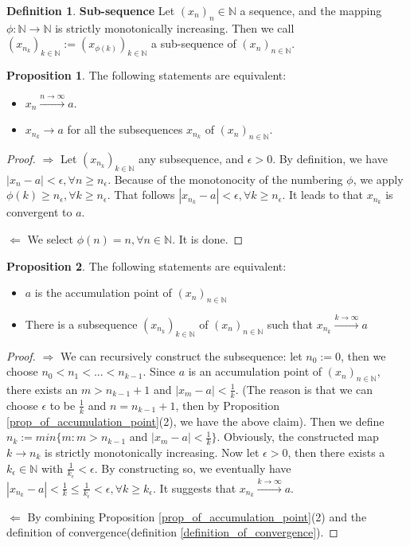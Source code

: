 \documentclass{article}
\theoremstyle{definition}
\newtheorem{defi}{Definition}[subsection]
\newtheorem{prop}{Proposition}[subsection]
\begin{document}
\begin{defi}
\textbf{Sub-sequence} Let $(x_n)_n\in \mathbb{N}$ a sequence, and the mapping $\phi: \mathbb{N}\to \mathbb{N}$ is strictly monotonically increasing. Then we call $(x_{n_{k}})_{k\in\mathbb{N}} := (x_{\phi(k)})_{k\in\mathbb{N}}$ a sub-sequence of $(x_n)_{n\in\mathbb{N}}$. 
\end{defi}

\begin{prop}
The following statements are equivalent:
\begin{itemize}
    \item $x_n \xrightarrow{n\to\infty}a$.
    \item $x_{n_{k}} \xrightarrow{}a$ for all the subsequences $x_{n_{k}}$ of $(x_n)_{n\in\mathbb{N}}$.
\end{itemize}
\begin{proof}
$\Rightarrow$ Let $(x_{n_{k}})_{k\in\mathbb{N}}$ any subsequence, and $\epsilon>0$. By definition, we have $|x_n-a|<\epsilon, \forall n \geq n_\epsilon$. Because of the monotonocity of the numbering $\phi$, we apply $\phi(k)\geq n_{\epsilon}, \forall k\geq n_\epsilon$. That follows $|x_{n_{k}}-a|<\epsilon, \forall k\geq n_{\epsilon}$. It leads to that $x_{n_{k}}$ is convergent to $a$.

$\Leftarrow$ We select $\phi(n)=n, \forall n\in\mathbb{N}$. It is done.
\end{proof}
\end{prop}

\begin{prop}
The following statements are equivalent:
\begin{itemize}
    \item $a$ is the accumulation point of $(x_n)_{n\in\mathbb{N}}$
    \item There is a subsequence $(x_{n_{k}})_{k\in\mathbb{N}}$ of $(x_n)_{n\in\mathbb{N}}$ such that $x_{n_{k}} \xrightarrow{k\to\infty} a$
\end{itemize}
\begin{proof}

$\Rightarrow$ We can recursively construct the subsequence: let $n_0:=0$, then we choose $n_0<n_1<...<n_{k-1}$. Since $a$ is an accumulation point of $(x_n)_{n\in\mathbb{N}}$, there exists an $m>n_{k-1} + 1$ and $|x_m-a|<\frac{1}{k}$. (The reason is that we can choose $\epsilon$ to be $\frac{1}{k}$ and $n=n_{k-1}+1$, then by Proposition \ref{prop_of_accumulation_point}(2), we have the above claim). Then we define $n_k := min\{m: m>n_{k-1}$ and $|x_m-a|<\frac{1}{k}\}$. Obviously, the constructed map $k\to n_k$ is strictly monotonically increasing. Now let $\epsilon>0$, then there exists a $k_\epsilon \in \mathbb{N}$ with $\frac{1}{k_\epsilon}<\epsilon$. By constructing so, we eventually have $|x_{n_{k}}-a|<\frac{1}{k}\leq \frac{1}{k_\epsilon} < \epsilon, \forall k \geq k_\epsilon$. It suggests that $x_{n_{k}} \xrightarrow{k\to\infty}a$.

$\Leftarrow$ By combining Proposition \ref{prop_of_accumulation_point}(2) and the definition of convergence(definition \ref{definition_of_convergence}).
\end{proof}
\end{prop}
\end{document}
